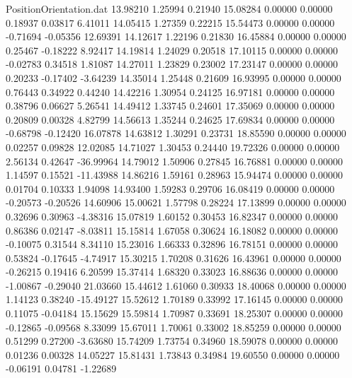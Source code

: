 \begin{filecontents}{PositionOrientation.dat}
  13.98210    1.25994    0.21940    15.08284    0.00000    0.00000    0.18937    0.03817    6.41011
  14.05415    1.27359    0.22215    15.54473    0.00000    0.00000   -0.71694   -0.05356   12.69391
  14.12617    1.22196    0.21830    16.45884    0.00000    0.00000    0.25467   -0.18222    8.92417
  14.19814    1.24029    0.20518    17.10115    0.00000    0.00000   -0.02783    0.34518    1.81087
  14.27011    1.23829    0.23002    17.23147    0.00000    0.00000    0.20233   -0.17402   -3.64239
  14.35014    1.25448    0.21609    16.93995    0.00000    0.00000    0.76443    0.34922    0.44240
  14.42216    1.30954    0.24125    16.97181    0.00000    0.00000    0.38796    0.06627    5.26541
  14.49412    1.33745    0.24601    17.35069    0.00000    0.00000    0.20809    0.00328    4.82799
  14.56613    1.35244    0.24625    17.69834    0.00000    0.00000   -0.68798   -0.12420   16.07878
  14.63812    1.30291    0.23731    18.85590    0.00000    0.00000    0.02257    0.09828   12.02085
  14.71027    1.30453    0.24440    19.72326    0.00000    0.00000    2.56134    0.42647  -36.99964
  14.79012    1.50906    0.27845    16.76881    0.00000    0.00000    1.14597    0.15521  -11.43988
  14.86216    1.59161    0.28963    15.94474    0.00000    0.00000    0.01704    0.10333    1.94098
  14.93400    1.59283    0.29706    16.08419    0.00000    0.00000   -0.20573   -0.20526   14.60906
  15.00621    1.57798    0.28224    17.13899    0.00000    0.00000    0.32696    0.30963   -4.38316
  15.07819    1.60152    0.30453    16.82347    0.00000    0.00000    0.86386    0.02147   -8.03811
  15.15814    1.67058    0.30624    16.18082    0.00000    0.00000   -0.10075    0.31544    8.34110
  15.23016    1.66333    0.32896    16.78151    0.00000    0.00000    0.53824   -0.17645   -4.74917
  15.30215    1.70208    0.31626    16.43961    0.00000    0.00000   -0.26215    0.19416    6.20599
  15.37414    1.68320    0.33023    16.88636    0.00000    0.00000   -1.00867   -0.29040   21.03660
  15.44612    1.61060    0.30933    18.40068    0.00000    0.00000    1.14123    0.38240  -15.49127
  15.52612    1.70189    0.33992    17.16145    0.00000    0.00000    0.11075   -0.04184   15.15629
  15.59814    1.70987    0.33691    18.25307    0.00000    0.00000   -0.12865   -0.09568    8.33099
  15.67011    1.70061    0.33002    18.85259    0.00000    0.00000    0.51299    0.27200   -3.63680
  15.74209    1.73754    0.34960    18.59078    0.00000    0.00000    0.01236    0.00328   14.05227
  15.81431    1.73843    0.34984    19.60550    0.00000    0.00000   -0.06191    0.04781   -1.22689

\end{filecontents}
